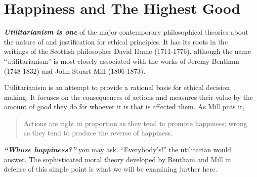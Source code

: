 \documentclass[12pt, openany]{book}
\begin{document}
\hypertarget{happiness-and-the-highest-good}{%
\section{Happiness and The Highest Good}\label{happiness-and-the-highest-good}}

\textbf{\emph{Utilitarianism is one}} of the major contemporary philosophical theories about the nature of and justification for ethical principles. It has its roots in the writings of the Scottish philosopher David Hume (1711-1776), although the name ``utilitarianism'' is most closely associated with the works of Jeremy Bentham (1748-1832) and John Stuart Mill (1806-1873).

Utilitarianism is an attempt to provide a rational basis for ethical decision making. It focuses on the consequences of actions and measures their value by the amount of good they do for whoever it is that is affected them. As Mill puts it,

\begin{quote}
Actions are right in proportion as they tend to promote happiness; wrong as they tend to produce the reverse of happiness.
\end{quote}

\textbf{\emph{``Whose happiness?''}} you may ask. ``Everybody's!'' the utilitarian would answer. The sophisticated moral theory developed by Bentham and Mill in defense of this simple point is what we will be examining further here.
\end{document}

